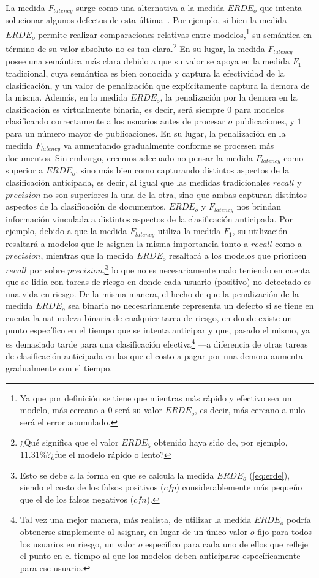 La medida $F_{latency}$ surge como una alternativa a la medida $ERDE_o$ que intenta solucionar algunos defectos de esta última~\cite{sadeque2018measuring}.
Por ejemplo, si bien la medida $ERDE_o$ permite realizar comparaciones relativas entre modelos,\footnote{Ya que por definición se tiene que mientras más rápido y efectivo sea un modelo, más cercano a $0$ será su valor $ERDE_o$, es decir, más cercano a nulo será el error acumulado.} su semántica en término de su valor absoluto no es tan clara.\footnote{¿Qué significa que el valor $ERDE_5$ obtenido haya sido de, por ejemplo, $11.31\%$?¿fue el modelo rápido o lento?}
En su lugar, la medida $F_{latency}$ posee una semántica más clara debido a que su valor se apoya en la medida $F_1$ tradicional, cuya semántica es bien conocida y captura la efectividad de la clasificación, y un valor de penalización que explícitamente captura la demora de la misma.
Además, en la medida $ERDE_o$, la penalización por la demora en la clasificación es virtualmente binaria, es decir, será siempre $0$ para modelos clasificando correctamente a los usuarios antes de procesar $o$ publicaciones, y $1$ para un número mayor de publicaciones. 
En su lugar, la penalización en la medida $F_{latency}$ va aumentando gradualmente conforme se procesen más documentos.
Sin embargo, creemos adecuado no pensar la medida $F_{latency}$ como superior a $ERDE_o$, sino más bien como capturando distintos aspectos de la clasificación anticipada, es decir, al igual que las medidas tradicionales $recall$ y $precision$ no son superiores la una de la otra, sino que ambas capturan distintos aspectos de la clasificación de documentos, $ERDE_o$ y $F_{latency}$ nos brindan información vinculada a distintos aspectos de la clasificación anticipada.
Por ejemplo, debido a que la medida $F_{latency}$ utiliza la medida $F_1$, su utilización resaltará a modelos que le asignen la misma importancia tanto a $recall$ como a $precision$, mientras que la medida $ERDE_o$ resaltará a los modelos que prioricen $recall$ por sobre $precision$,\footnote{Esto se debe a la forma en que se calcula la medida $ERDE_o$ (\autoref{eq:erde}), siendo el costo de los falsos positivos ($cfp$) considerablemente más pequeño que el de los falsos negativos ($cfn$).} lo que no es necesariamente malo teniendo en cuenta que se lidia con tareas de riesgo en donde cada usuario (positivo) no detectado es una vida en riesgo.
De la misma manera, el hecho de que la penalización de la medida $ERDE_o$ sea binaria no necesariamente representa un defecto si se tiene en cuenta la naturaleza binaria de cualquier tarea de riesgo, en donde existe un punto específico en el tiempo que se intenta anticipar y que, pasado el mismo, ya es demasiado tarde para una clasificación efectiva\footnote{Tal vez una mejor manera, más realista, de utilizar la medida $ERDE_o$ podría obtenerse simplemente al asignar, en lugar de un único valor $o$ fijo para todos los usuarios en riesgo, un valor $o$ específico para cada uno de ellos que refleje el punto en el tiempo al que los modelos deben anticiparse específicamente para ese usuario.} ---a diferencia de otras tareas de clasificación anticipada en las que el costo a pagar por una demora aumenta gradualmente con el tiempo.

